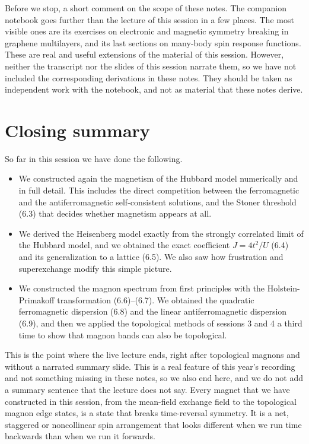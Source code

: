 Before we stop, a short comment on the scope of these notes. The companion notebook goes further than
the lecture of this session in a few places. The most visible ones are its exercises on electronic and
magnetic symmetry breaking in graphene multilayers, and its last sections on many-body spin response
functions. These are real and useful extensions of the material of this session. However, neither the
transcript nor the slides of this session narrate them, so we have not included the corresponding
derivations in these notes. They should be taken as independent work with the notebook, and not as
material that these notes derive.

\section{Closing summary}

So far in this session we have done the following.

\begin{itemize}
\item We constructed again the magnetism of the Hubbard model numerically and in full detail. This
  includes the direct competition between the ferromagnetic and the antiferromagnetic self-consistent
  solutions, and the Stoner threshold (6.3) that decides whether magnetism appears at all.
\item We derived the Heisenberg model exactly from the strongly correlated limit of the Hubbard model,
  and we obtained the exact coefficient $J=4t^2/U$ (6.4) and its generalization to a lattice (6.5).
  We also saw how frustration and superexchange modify this simple picture.
\item We constructed the magnon spectrum from first principles with the Holstein-Primakoff
  transformation (6.6)--(6.7). We obtained the quadratic ferromagnetic dispersion (6.8) and the linear
  antiferromagnetic dispersion (6.9), and then we applied the topological methods of sessions 3 and 4
  a third time to show that magnon bands can also be topological.
\end{itemize}

This is the point where the live lecture ends, right after topological magnons and without a narrated
summary slide. This is a real feature of this year's recording and not something missing in these
notes, so we also end here, and we do not add a summary sentence that the lecture does not say. Every
magnet that we have constructed in this session, from the mean-field exchange field to the
topological magnon edge states, is a state that breaks time-reversal symmetry. It is a net, staggered
or noncollinear spin arrangement that looks different when we run time backwards than when we run it
forwards.

